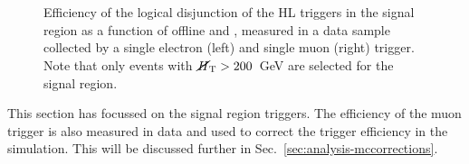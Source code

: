 \begin{figure}
\\
~~
\\
\caption{Efficiency of the logical disjunction of the HL triggers in the signal 
region as a function of 
offline \mht and \scalht, measured in a data sample collected by a single 
electron (left) and single muon (right) trigger. Note that only events with 
$\mbox{$\cancel{H}_\text{T}$}>200$~GeV are selected for the signal region.}
\label{fig:trigger-eff}
\end{figure}

This section has focussed on the signal region triggers. The efficiency of the 
muon trigger is also measured in data and used to correct the trigger 
efficiency in the simulation. This will be discussed further in 
Sec.~\ref{sec:analysis-mccorrections}.


